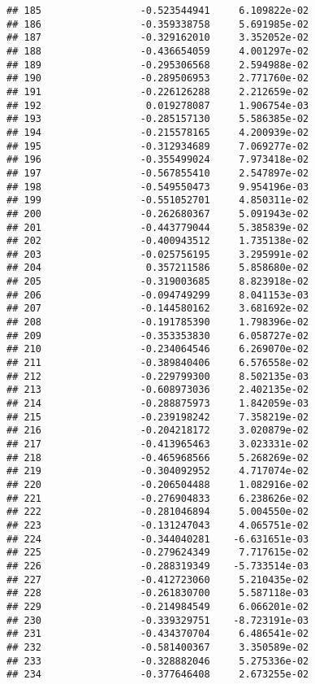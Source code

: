 \documentclass[
]{article}
\begin{document}
\begin{verbatim}
## 185                 -0.523544941     6.109822e-02
## 186                 -0.359338758     5.691985e-02
## 187                 -0.329162010     3.352052e-02
## 188                 -0.436654059     4.001297e-02
## 189                 -0.295306568     2.594988e-02
## 190                 -0.289506953     2.771760e-02
## 191                 -0.226126288     2.212659e-02
## 192                  0.019278087     1.906754e-03
## 193                 -0.285157130     5.586385e-02
## 194                 -0.215578165     4.200939e-02
## 195                 -0.312934689     7.069277e-02
## 196                 -0.355499024     7.973418e-02
## 197                 -0.567855410     2.547897e-02
## 198                 -0.549550473     9.954196e-03
## 199                 -0.551052701     4.850311e-02
## 200                 -0.262680367     5.091943e-02
## 201                 -0.443779044     5.385839e-02
## 202                 -0.400943512     1.735138e-02
## 203                 -0.025756195     3.295991e-02
## 204                  0.357211586     5.858680e-02
## 205                 -0.319003685     8.823918e-02
## 206                 -0.094749299     8.041153e-03
## 207                 -0.144580162     3.681692e-02
## 208                 -0.191785390     1.798396e-02
## 209                 -0.353353830     6.058727e-02
## 210                 -0.234064546     6.269070e-02
## 211                 -0.389840406     6.576558e-02
## 212                 -0.229799300     8.502135e-03
## 213                 -0.608973036     2.402135e-02
## 214                 -0.288875973     1.842059e-03
## 215                 -0.239198242     7.358219e-02
## 216                 -0.204218172     3.020879e-02
## 217                 -0.413965463     3.023331e-02
## 218                 -0.465968566     5.268269e-02
## 219                 -0.304092952     4.717074e-02
## 220                 -0.206504488     1.082916e-02
## 221                 -0.276904833     6.238626e-02
## 222                 -0.281046894     5.004550e-02
## 223                 -0.131247043     4.065751e-02
## 224                 -0.344040281    -6.631651e-03
## 225                 -0.279624349     7.717615e-02
## 226                 -0.288319349    -5.733514e-03
## 227                 -0.412723060     5.210435e-02
## 228                 -0.261830700     5.587118e-03
## 229                 -0.214984549     6.066201e-02
## 230                 -0.339329751    -8.723191e-03
## 231                 -0.434370704     6.486541e-02
## 232                 -0.581400367     3.350589e-02
## 233                 -0.328882046     5.275336e-02
## 234                 -0.377646408     2.673255e-02

\end{verbatim}
\end{document}
